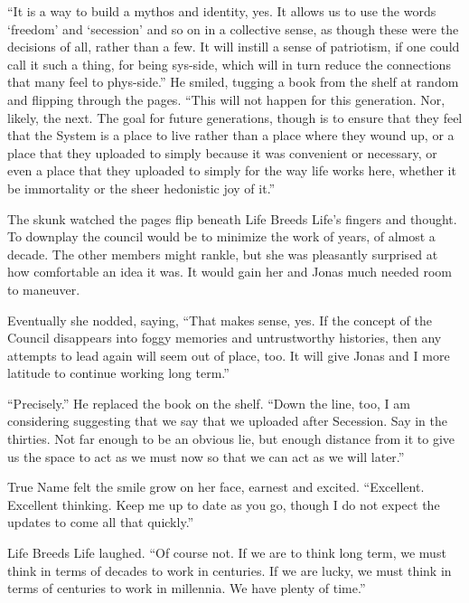 ``It is a way to build a mythos and identity, yes. It allows us to use the words `freedom' and `secession' and so on in a collective sense, as though these were the decisions of all, rather than a few. It will instill a sense of patriotism, if one could call it such a thing, for being sys-side, which will in turn reduce the connections that many feel to phys-side.'' He smiled, tugging a book from the shelf at random and flipping through the pages. ``This will not happen for this generation. Nor, likely, the next. The goal for future generations, though is to ensure that they feel that the System is a place to live rather than a place where they wound up, or a place that they uploaded to simply because it was convenient or necessary, or even a place that they uploaded to simply for the way life works here, whether it be immortality or the sheer hedonistic joy of it.''

The skunk watched the pages flip beneath Life Breeds Life's fingers and thought. To downplay the council would be to minimize the work of years, of almost a decade. The other members might rankle, but she was pleasantly surprised at how comfortable an idea it was. It would gain her and Jonas much needed room to maneuver.

Eventually she nodded, saying, ``That makes sense, yes. If the concept of the Council disappears into foggy memories and untrustworthy histories, then any attempts to lead again will seem out of place, too. It will give Jonas and I more latitude to continue working long term.''

``Precisely.'' He replaced the book on the shelf. ``Down the line, too, I am considering suggesting that we say that we uploaded after Secession. Say in the thirties. Not far enough to be an obvious lie, but enough distance from it to give us the space to act as we must now so that we can act as we will later.''

True Name felt the smile grow on her face, earnest and excited. ``Excellent. Excellent thinking. Keep me up to date as you go, though I do not expect the updates to come all that quickly.''

Life Breeds Life laughed. ``Of course not. If we are to think long term, we must think in terms of decades to work in centuries. If we are lucky, we must think in terms of centuries to work in millennia. We have plenty of time.''
